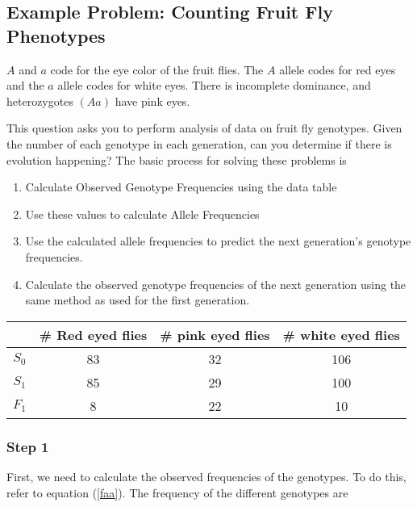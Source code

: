 \documentclass[12pt]{article}
\begin{document}

\subsection{Example Problem: Counting Fruit Fly Phenotypes}

$A$ and $a$ code for the eye color of the fruit flies. The $A$ allele codes for red eyes and the $a$ allele codes for white eyes. There is incomplete dominance, and heterozygotes $(Aa)$ have pink eyes.

This question asks you to perform analysis of data on fruit fly genotypes. Given the number of each genotype in each generation, can you determine if there is evolution happening? The basic process for solving these problems is 

\begin{enumerate}
    \item Calculate Observed Genotype Frequencies using the data table
    \item Use these values to calculate Allele Frequencies
    \item Use the calculated allele frequencies to predict the next generation's genotype frequencies.
    \item Calculate the observed genotype frequencies of the next generation using the same method as used for the first generation.
\end{enumerate}

\begin{table}[h]
    \centering
    \begin{tabular}{|c | c c c|}
        \hline
              & \# Red eyed flies & \# pink eyed flies & \# white eyed flies \\\hline
        $S_0$ & 83                & 32                 & 106                 \\
        $S_1$ & 85                & 29                 & 100                 \\
        $F_1$ & 8                 & 22                 & 10                  \\\hline
    \end{tabular}
\end{table}

\subsubsection{Step 1}

First, we need to calculate the observed frequencies of the genotypes. To do this, refer to equation (\ref{faa}). The frequency of the different genotypes are
\end{document}
